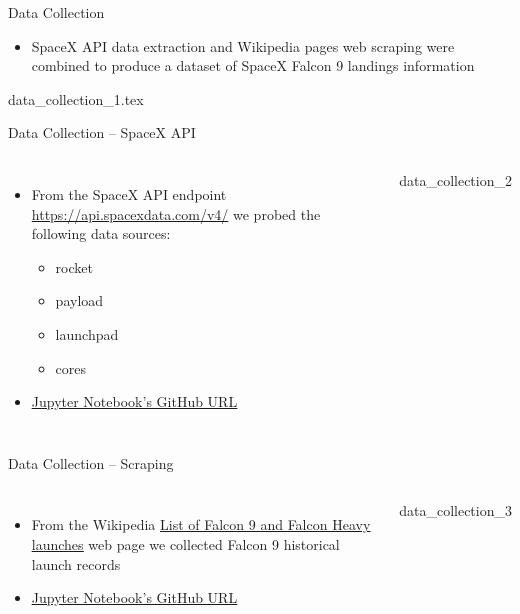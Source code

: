\begin{frame}{Data Collection}
    \begin{itemize}
        \item SpaceX API data extraction and Wikipedia pages web scraping were combined to produce a dataset of SpaceX Falcon 9 landings information
    \end{itemize}
    {data_collection_1.tex}
\end{frame}

{\nologo
\begin{frame}{Data Collection -- SpaceX API}
    \begin{columns}
            \begin{itemize}
                \item From the SpaceX API endpoint \url{https://api.spacexdata.com/v4/} we probed the following data sources:
                \begin{itemize}
                    \item rocket
                    \item payload
                    \item launchpad
                    \item cores
                \end{itemize}
                \item \href{https://github.com/eyamrog/ibm_data_science/blob/main/10_Data_Science_Capstone_Lab1_Collecting_the_Data.ipynb}{\uline{Jupyter Notebook's GitHub URL}}
            \end{itemize}
            {data_collection_2}
    \end{columns}
\end{frame}
}

{\nologo
\begin{frame}{Data Collection -- Scraping}
    \begin{columns}
            \begin{itemize}
                \item From the Wikipedia \href{https://en.wikipedia.org/wiki/List_of_Falcon_9_and_Falcon_Heavy_launches}{\uline{List of Falcon 9 and Falcon Heavy launches}} web page we collected Falcon 9 historical launch records
                \item \href{https://github.com/eyamrog/ibm_data_science/blob/main/10_Data_Science_Capstone_Lab1_Collecting_the_Data.ipynb}{\uline{Jupyter Notebook's GitHub URL}}
            \end{itemize}
            {data_collection_3}
    \end{columns}
\end{frame}
}

